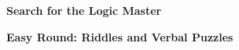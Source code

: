 
 

\newcommand{\ExamName}{Search for Logic Master}

\linespread{1}



\printanswers

\begin{center}
\textbf{Search for the Logic Master}
\end{center} 

\textbf{Easy Round: Riddles and Verbal Puzzles}

 


